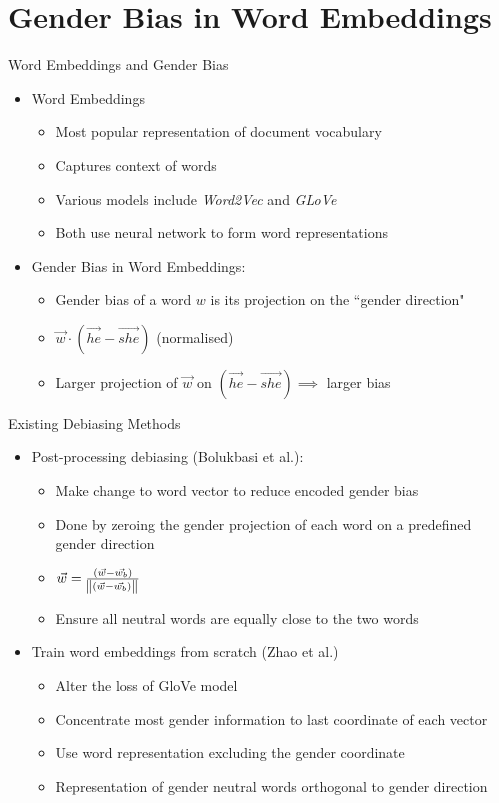 \documentclass{beamer}
\begin{document}
\section{Gender Bias in Word Embeddings}
	\begin{frame}{Word Embeddings and Gender Bias}
		\begin{itemize}
			\item Word Embeddings
			\begin{itemize}
				\item Most popular representation of document vocabulary
				\item Captures context of words
				\item Various models include \emph{Word2Vec} and \emph{GLoVe}
				\item Both use neural network to form word representations
			\end{itemize}
			\item Gender Bias in Word Embeddings:
			\begin{itemize}
				\item Gender bias of a word $w$ is its projection on the ``gender direction"
				\item $\vec{w}\cdot(\vec{he}-\vec{she})$ (normalised)
				\item Larger projection of $\vec{w}$ on $(\vec{he}-\vec{she}) \implies$ larger bias
			\end{itemize}
		\end{itemize}
		
	\end{frame}

	\begin{frame}{Existing Debiasing Methods}
		\begin{itemize}
			\item Post-processing debiasing (Bolukbasi et al.):
			\begin{itemize}
				\item Make change to word vector to reduce encoded gender bias
				\item Done by zeroing the gender projection of each word on a predefined gender direction
				\item $\vec{w} = \frac{(\vec{w} - \vec{w_b})}{\norm{(\vec{w} - \vec{w_b})}}$
				\item Ensure all neutral words are equally close to the two words
			\end{itemize}
			\item Train word embeddings from scratch (Zhao et al.)
			\begin{itemize}
				\item Alter the loss of GloVe model
				\item Concentrate most gender information to last coordinate of each vector
				\item Use word representation excluding the gender coordinate
				\item Representation of gender neutral words orthogonal to gender direction
			\end{itemize}
		\end{itemize}
	\end{frame}
\end{document}

